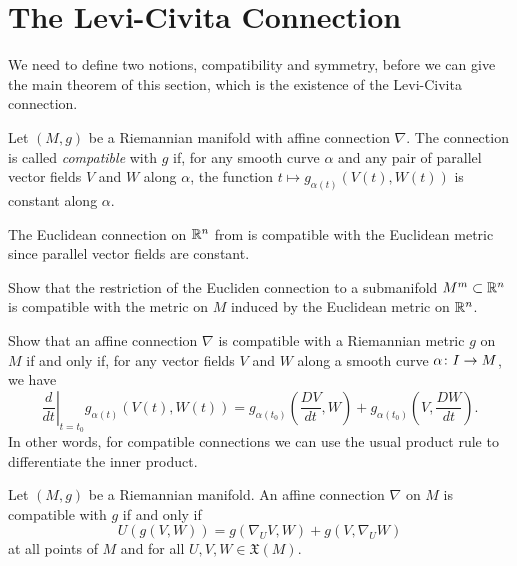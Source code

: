 
\section{The Levi-Civita Connection}
\label{sec:levi-civita connection}

We need to define two notions, compatibility and symmetry, before we can give the main theorem of this section, which is the existence of the Levi-Civita connection.

\begin{definition}\label{def:compatible connection}
	Let $(M,g)$ be a Riemannian manifold with affine connection $\nabla$. The connection is called \emph{compatible} with $g$ if, for any smooth curve $\alpha$ and any pair of parallel vector fields $V$ and $W$ along $\alpha$, the function $t \mapsto g_{\alpha(t)}(V(t),W(t))$ is constant along $\alpha$.
\end{definition}

\begin{example}
	The Euclidean connection on $\mathbb{R}^n$ from  is compatible with the Euclidean metric since parallel vector fields are constant.
\end{example}

\begin{exercise}
	 Show that the restriction of the Eucliden connection to a submanifold $M^m \subset \mathbb{R}^n$ is compatible with the metric on $M$ induced by the Euclidean metric on $\mathbb{R}^n$.
\end{exercise}

\begin{exercise}\label{ex:compatibility and covariant differentiation}
	Show that an affine connection $\nabla$ is compatible with a Riemannian metric $g$ on $M$ if and only if, for any vector fields $V$ and $W$ along a smooth curve $\alpha \colon\thinspace\! I \to M$, we have
	\[
		\left.\frac{d}{dt}\right|_{t=t_0} g_{\alpha(t)}(V(t),W(t)) = g_{\alpha(t_0)} \left(\frac{DV}{dt},W\right) + g_{\alpha(t_0)} \left(V,\frac{DW}{dt}\right).
	\]
	In other words, for compatible connections we can use the usual product rule to differentiate the inner product.
\end{exercise}

\begin{corollary}\label{cor:compatibility equation}
	Let $(M,g)$ be a Riemannian manifold. An affine connection $\nabla$ on $M$ is compatible with $g$ if and only if 
	\begin{equation}\label{eq:compatibility}
		U(g(V,W)) = g(\nabla_UV,W) + g(V,\nabla_UW)
	\end{equation}
	at all points of $M$ and for all $U,V,W \in \mathfrak{X}(M)$.
\end{corollary}

